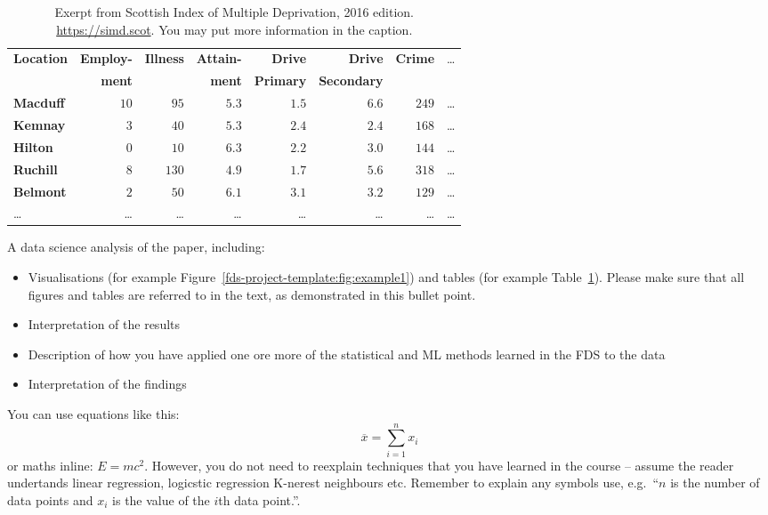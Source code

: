 \documentclass[11pt,a4paper]{article}
\begin{document}
\begin{table}[b]
  \caption{Exerpt from Scottish Index of Multiple Deprivation, 2016 edition.
    \url{https://simd.scot}. You may put more information in the caption.}
  \label{tab:example1}
\begin{tabular}{lrrrrrrr}
\hline\hline
\textbf{Location}&\textbf{Employ-}&\textbf{Illness}&\textbf{Attain-}&\textbf{Drive}  &\textbf{Drive}    &\textbf{Crime}&\dots\\
                 &\textbf{ment}   &                &\textbf{ment}   &\textbf{Primary}&\textbf{Secondary}&              &\\
\hline
\textbf{Macduff}&$10$&$ 95$&$5.3$&$1.5$&$6.6$&$249$&\dots\tabularnewline
\textbf{Kemnay}&$ 3$&$ 40$&$5.3$&$2.4$&$2.4$&$168$&\dots\tabularnewline
\textbf{Hilton}&$ 0$&$ 10$&$6.3$&$2.2$&$3.0$&$144$&\dots\tabularnewline
\textbf{Ruchill}&$ 8$&$130$&$4.9$&$1.7$&$5.6$&$318$&\dots\tabularnewline
\textbf{Belmont}&$ 2$&$ 50$&$6.1$&$3.1$&$3.2$&$129$&\dots\tabularnewline
\dots&\dots&\dots&\dots&\dots&\dots&\dots&\dots\tabularnewline
\hline
\end{tabular}
\end{table}

A data science analysis of the paper, including: 
\begin{itemize}
\item Visualisations (for example
  Figure~\ref{fds-project-template:fig:example1}) and tables (for
  example Table~\ref{tab:example1}). Please make sure that all figures
  and tables are referred to in the text, as demonstrated in this
  bullet point.
\item Interpretation of the results 
\item Description of how you have applied one ore more of the
  statistical and ML methods learned in the FDS to the data
\item Interpretation of the findings 
\end{itemize}

You can use equations like this:
\begin{equation}
  \label{fds-project-template:eq:1}
  \overline{x} = \sum_{i=1}^n x_i
\end{equation}
or maths inline: $E=mc^2$. However, you do not need to reexplain techniques that you have learned in the course -- assume the reader undertands linear regression, logicstic regression K-nerest neighbours etc.  Remember to explain any symbols use, e.g.~``$n$ is the number of data points and $x_i$ is the value of the $i$th data point.''.
\end{document}
